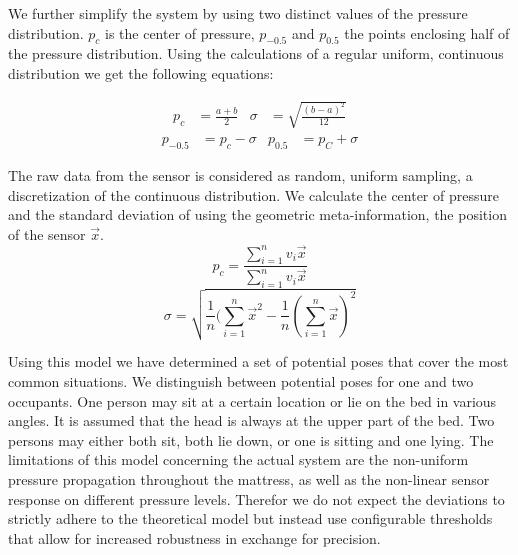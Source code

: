 We further simplify the system by using two distinct values of the pressure distribution. $p_c$ is the center of pressure, $p_{-0.5}$ and $p_{0.5}$ the points enclosing half of the pressure distribution. Using the calculations of a regular uniform, continuous distribution we get the following equations:

\begin{align}
p_c&=\frac{a+b}{2} & \sigma&=\sqrt{\frac{(b-a)^2}{12}}
\end{align}
\begin{align}
p_{-0.5}&=p_c-\sigma &	p_{0.5}&=p_C+\sigma
\end{align}

The raw data from the sensor is considered as random, uniform sampling, a discretization of the continuous distribution. We calculate the center of pressure and the standard deviation of using the geometric meta-information, the position of the sensor $\overrightarrow{x}$.
\begin{equation}
p_c=\frac{\sum_{i=1}^n{v_i\overrightarrow{x}}}{\sum_{i=1}^n{v_i\overrightarrow{x}}}
\end{equation}
\begin{equation}
\sigma=\sqrt{\frac{1}{n}(\sum_{i=1}^n{\overrightarrow{x}^2}-\frac{1}{n}(\sum_{i=1}^n{\overrightarrow{x}})^2}
\end{equation}

Using this model we have determined a set of potential poses that cover the most common situations. We distinguish between potential poses for one and two occupants. One person may sit at a certain location or lie on the bed in various angles. It is assumed that the head is always at the upper part of the bed. Two persons may either both sit, both lie down, or one is sitting and one lying. 
The limitations of this model concerning the actual system are the non-uniform pressure propagation throughout the mattress, as well as the non-linear sensor response on different pressure levels. Therefor we do not expect the deviations to strictly adhere to the theoretical model but instead use configurable thresholds that allow for increased robustness in exchange for precision.

